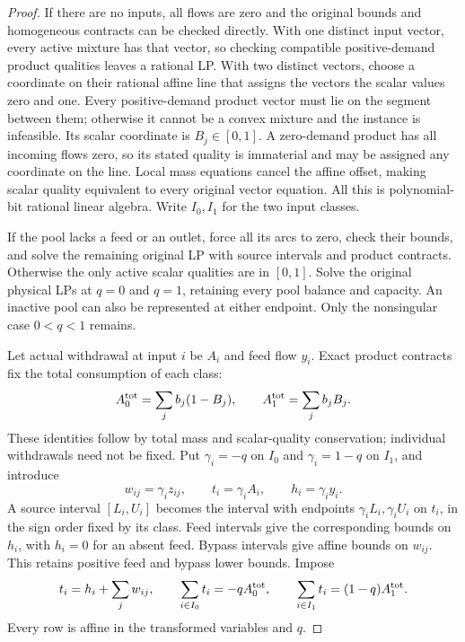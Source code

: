 \begin{proof}
If there are no inputs, all flows are zero and the original bounds
and homogeneous contracts can be checked directly. With one distinct
input vector, every active mixture has that vector,
so checking compatible positive-demand product qualities leaves a
rational LP. With two distinct vectors, choose a coordinate on their
rational affine line that assigns the vectors the scalar values zero
and one. Every positive-demand product vector must lie on the segment
between them; otherwise it cannot be a convex mixture and the instance
is infeasible. Its scalar coordinate is $B_j\in[0,1]$. A zero-demand
product has all incoming flows zero, so its stated quality is immaterial
and may be assigned any coordinate on the line. Local mass equations
cancel the affine offset, making scalar quality equivalent to every
original vector equation. All this is polynomial-bit rational linear
algebra. Write $I_0,I_1$ for the two input classes.

If the pool lacks a feed or an outlet, force all its arcs to zero,
check their bounds, and solve the remaining original LP with source
intervals and product contracts. Otherwise the only active scalar
qualities are in $[0,1]$. Solve the original physical LPs at $q=0$ and
$q=1$, retaining every pool balance and capacity. An inactive pool can
also be represented at either endpoint. Only the nonsingular case
$0<q<1$ remains.

Let actual withdrawal at input $i$ be $A_i$ and feed flow $y_i$.
Exact product contracts fix the total consumption of each class:
\begin{equation}
 A_0^{\rm tot}=\sum_jb_j(1-B_j),\qquad
 A_1^{\rm tot}=\sum_jb_jB_j.
 \label{s5:class-totals}
\end{equation}
These identities follow by total mass and scalar-quality conservation;
individual withdrawals need not be fixed. Put $\gamma_i=-q$ on $I_0$
and $\gamma_i=1-q$ on $I_1$, and introduce
\begin{equation}
 w_{ij}=\gamma_i z_{ij},\qquad t_i=\gamma_i A_i,
 \qquad h_i=\gamma_i y_i.
 \label{s5:two-scaling}
\end{equation}
A source interval $[L_i,U_i]$ becomes the interval with endpoints
$\gamma_iL_i,\gamma_iU_i$ on $t_i$, in the sign order fixed by its
class. Feed intervals give the corresponding bounds on $h_i$, with
$h_i=0$ for an absent feed. Bypass intervals give affine bounds on
$w_{ij}$. This retains positive feed and bypass lower bounds. Impose
\begin{equation}
 t_i=h_i+\sum_jw_{ij},\qquad
 \sum_{i\in I_0}t_i=-q A_0^{\rm tot},\qquad
 \sum_{i\in I_1}t_i=(1-q)A_1^{\rm tot}.
 \label{s5:two-input-rows}
\end{equation}
Every row is affine in the transformed variables and $q$.


\end{proof}

